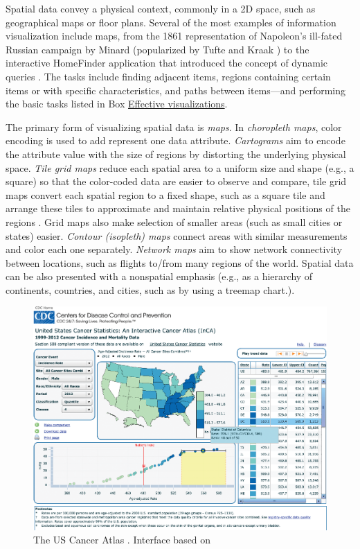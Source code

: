 \documentclass[]{krantz}
\begin{document}
Spatial data convey a physical context, commonly in a 2D space, such as
geographical maps or floor plans. Several of the most examples of
information visualization include maps, from the 1861 representation of
Napoleon's ill-fated Russian campaign by Minard (popularized by Tufte
\citet{edward2001visual} and Kraak \citet{Kraak2014}) to the interactive
HomeFinder application that introduced the concept of dynamic queries
\citep{ahlberg1992dynamic}. The tasks include finding adjacent items,
regions containing certain items or with specific characteristics, and
paths between items---and performing the basic tasks listed in Box
\protect\hyperlink{box:viz1}{Effective visualizations}.

The primary form of visualizing spatial data is \emph{maps}. In
\emph{choropleth maps}, color encoding is used to add represent one data
attribute. \emph{Cartograms} aim to encode the attribute value with the
size of regions by distorting the underlying physical space. \emph{Tile
grid maps} reduce each spatial area to a uniform size and shape (e.g., a
square) so that the color-coded data are easier to observe and compare,
tile grid maps convert each spatial region to a fixed shape, such as a
square tile and arrange these tiles to approximate and maintain relative
physical positions of the regions \citep{DeBelius2015, ProtoVis2015}.
Grid maps also make selection of smaller areas (such as small cities or
states) easier. \emph{Contour (isopleth) maps} connect areas with
similar measurements and color each one separately. \emph{Network maps}
aim to show network connectivity between locations, such as flights
to/from many regions of the world. Spatial data can be also presented
with a nonspatial emphasis (e.g., as a hierarchy of continents,
countries, and cities, such as by using a treemap chart.).

\begin{figure}

{\centering \includegraphics[width=0.9\linewidth]{ChapterViz/figures/fig9-5} 

}

\caption{The US Cancer Atlas \citep{usca}. Interface based on \citep{maceachren2008design}}\label{fig:fig9-5}
\end{figure}
\end{document}
